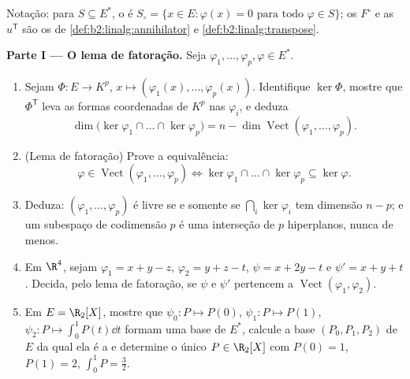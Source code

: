 \begin{problem}
\label{pb:b2:linalg:1}
Notação: para $S \subseteq E^*$, o \emph{} é
$S_\circ = \{x \in E : \varphi(x) = 0 \text{ para todo } \varphi
\in S\}$; os  $F^\circ$ e as  $u^{\mathsf T}$
são os de \cref{def:b2:linalg:annihilator} e
\cref{def:b2:linalg:transpose}.

\medskip
\noindent\textbf{Parte I --- O lema de fatoração.} Seja
$\varphi_1, \dots, \varphi_p, \varphi \in E^*$.
\begin{enumerate}
  \item Sejam $\Phi \colon E \to K^p$, $x \mapsto (\varphi_1(x),
        \dots, \varphi_p(x))$. Identifique $\ker\Phi$, mostre
        que $\Phi^{\mathsf T}$ leva as formas coordenadas de $K^p$ nas
        $\varphi_i$, e deduza
        \[
        \dim \bigl(\ker\varphi_1 \cap \dots \cap
        \ker\varphi_p\bigr) = n - \dim
        \operatorname{Vect}(\varphi_1, \dots, \varphi_p).
        \]
  \item (Lema de fatoração) Prove a equivalência:
        \[
        \varphi \in \operatorname{Vect}(\varphi_1, \dots,
        \varphi_p)
        \iff
        \ker\varphi_1 \cap \dots \cap \ker\varphi_p \subseteq
        \ker\varphi .
        \]
  \item Deduza: $(\varphi_1, \dots, \varphi_p)$ é livre se e somente se
        $\bigcap_i \ker\varphi_i$ tem dimensão $n - p$; e um
        subespaço de codimensão $p$ é uma interseção de $p$
        hiperplanos, nunca de menos.
  \item Em $\R^4$, sejam $\varphi_1 = x + y - z$, $\varphi_2 = y +
        z - t$, $\psi = x + 2y - t$ e $\psi' = x + y + t$.
        Decida, pelo lema de fatoração, se $\psi$ e
        $\psi'$ pertencem a $\operatorname{Vect}(\varphi_1,
        \varphi_2)$.
  \item Em $E = \R_2[X]$, mostre que $\psi_0 \colon P \mapsto
        P(0)$, $\psi_1 \colon P \mapsto P(1)$, $\psi_2 \colon P
        \mapsto \int_0^1 P(t)\dd t$ formam uma base de $E^*$,
        calcule a base $(P_0, P_1, P_2)$ de $E$ da qual ela é a
         e determine o único $P \in \R_2[X]$ com $P(0)
        = 1$, $P(1) = 2$, $\int_0^1 P = \frac32$.
\end{enumerate}


\end{problem}
